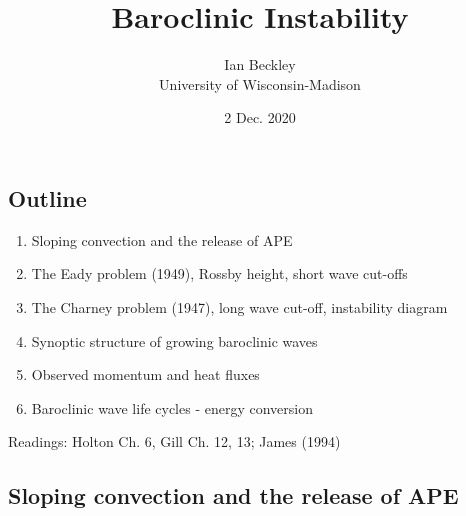 \documentclass[a4paper,12pt]{article}
\begin{document}
\title{\vspace{-4.0cm}Baroclinic Instability}
\author{Ian Beckley
\\University of Wisconsin-Madison}

\date{2 Dec. 2020}

\maketitle

\subsection*{Outline}

\begin{enumerate}
	\item Sloping convection and the release of APE
	\item The Eady problem (1949), Rossby height, short wave cut-offs
	\item The Charney problem (1947), long wave cut-off, instability diagram
	\item Synoptic structure of growing baroclinic waves
	\item Observed momentum and heat fluxes
	\item Baroclinic wave life cycles - energy conversion
\end{enumerate}

Readings: Holton Ch. 6, Gill Ch. 12, 13; James (1994)

\subsection*{Sloping convection and the release of APE}
\end{document}
